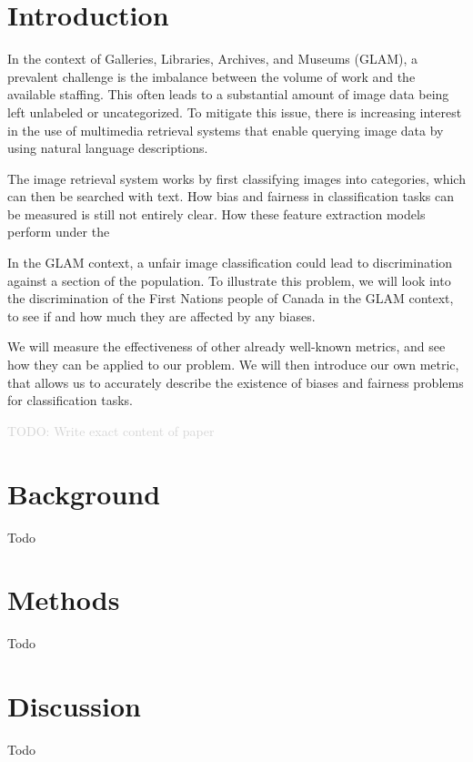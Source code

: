 \documentclass[12pt,a4paper,titlepage,oneside,english]{article}
\begin{document}
\section{Introduction}



In the context of Galleries, Libraries, Archives, and Museums (GLAM), a prevalent challenge is the imbalance between the volume of work and the available staffing. This often leads to a substantial amount of image data being left unlabeled or uncategorized. To mitigate this issue, there is increasing interest in the use of multimedia retrieval systems that enable querying image data by using natural language descriptions. 

The image retrieval system works by first classifying images into categories, which can then be searched with text. How bias and fairness in classification tasks can be measured is still not entirely clear. How these feature extraction models perform under the 

In the GLAM context, a unfair image classification could lead to discrimination against a section of the population. To illustrate this problem, we will look into the discrimination of the First Nations people of Canada in the GLAM context, to see if and how much they are affected by any biases.

We will measure the effectiveness of other already well-known metrics, and see how they can be applied to our problem. We will then introduce our own metric, that allows us to accurately describe the existence of biases and fairness problems for classification tasks.


\textcolor{lightgray}{TODO: Write exact content of paper} 


\section{Background}

Todo

\section{Methods}

Todo

\section{Discussion}

Todo

\newpage
\setcounter{page}{1}
\onehalfspacing
{}


\end{document}
